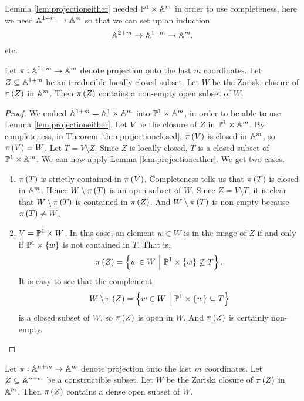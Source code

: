 Lemma \ref{lem:projectioneither} needed $ \PP^1 \times \AA^m $ in order to use completeness, here we need $ \AA^{1 + m} \to \AA^m $ so that we can set up an induction
$$ \AA^{2 + m} \to \AA^{1 + m} \to \AA^m, $$
etc.

\begin{lemma}
\label{lem:projectionopen}
Let $ \pi : \AA^{1 + m} \to \AA^m $ denote projection onto the last $ m $ coordinates. Let $ Z \subseteq \AA^{1 + m} $ be an irreducible locally closed subset. Let $ W $ be the Zariski closure of $ \pi\br{Z} $ in $ \AA^m $. Then $ \pi\br{Z} $ contains a non-empty open subset of $ W $.
\end{lemma}

\begin{proof}
We embed $ \AA^{1 + m} = \AA^1 \times \AA^m $ into $ \PP^1 \times \AA^m $, in order to be able to use Lemma \ref{lem:projectioneither}. Let $ V $ be the closure of $ Z $ in $ \PP^1 \times \AA^m $. By completeness, in Theorem \ref{thm:projectionclosed}, $ \pi\br{V} $ is closed in $ \AA^m $, so $ \pi\br{V} = W $. Let $ T = V \setminus Z $. Since $ Z $ is locally closed, $ T $ is a closed subset of $ \PP^1 \times \AA^m $. We can now apply Lemma \ref{lem:projectioneither}. We get two cases.
\begin{enumerate}[label=Case \arabic*., leftmargin=0.5in]
\item $ \pi\br{T} $ is strictly contained in $ \pi\br{V} $. Completeness tells us that $ \pi\br{T} $ is closed in $ \AA^m $. Hence $ W \setminus \pi\br{T} $ is an open subset of $ W $. Since $ Z = V \setminus T $, it is clear that $ W \setminus \pi\br{T} $ is contained in $ \pi\br{Z} $. And $ W \setminus \pi\br{T} $ is non-empty because $ \pi\br{T} \ne W $.
\item $ V = \PP^1 \times W $. In this case, an element $ w \in W $ is in the image of $ Z $ if and only if $ \PP^1 \times \cbr{w} $ is not contained in $ T $. That is,
$$ \pi\br{Z} = \cbr{w \in W \st \PP^1 \times \cbr{w} \not\subseteq T}. $$
It is easy to see that the complement
$$ W \setminus \pi\br{Z} = \cbr{w \in W \st \PP^1 \times \cbr{w} \subseteq T} $$
is a closed subset of $ W $, so $ \pi\br{Z} $ is open in $ W $. And $ \pi\br{Z} $ is certainly non-empty.
\end{enumerate}
\end{proof}

\pagebreak

\begin{corollary}
\label{cor:projectionopen}
Let $ \pi : \AA^{n + m} \to \AA^m $ denote projection onto the last $ m $ coordinates. Let $ Z \subseteq \AA^{n + m} $ be a constructible subset. Let $ W $ be the Zariski closure of $ \pi\br{Z} $ in $ \AA^m $. Then $ \pi\br{Z} $ contains a dense open subset of $ W $.
\end{corollary}

